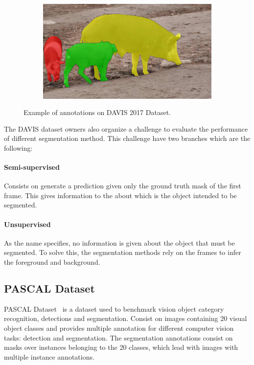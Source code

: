 \begin{figure}[h]
\begin{subfigure}{.25\textwidth}
\end{subfigure}%
\begin{subfigure}{.25\textwidth}
  \includegraphics[width=1.\linewidth]{figures/davis_dataset/image_4.jpg}
\end{subfigure}
\caption{Example of annotations on DAVIS 2017 Dataset.}
\label{fig:davis}
\end{figure}


The DAVIS dataset owners also organize a challenge to evaluate the performance of different segmentation method.
This challenge have two branches which are the following:

\paragraph{Semi-supervised}

Consists on generate a prediction given only the ground truth mask of the first frame.
This gives information to the about which is the object intended to be segmented.

\paragraph{Unsupervised}

As the name specifies, no information is given about the object that must be segmented.
To solve this, the segmentation methods rely on the frames to infer the foreground and background.

\subsection{PASCAL Dataset}

PASCAL Dataset~\cite{Everingham10} is a dataset used to benchmark vision object category recognition, detections and segmentation.
Consist on images containing 20 visual object classes and provides multiple annotation for different computer vision tasks: detection and segmentation.
The segmentation annotations consist on masks over instances belonging to the 20 classes, which lead with images with multiple instance annotations.

